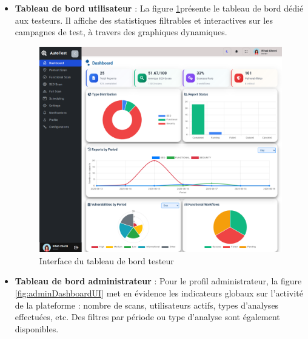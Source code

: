 \begin{itemize}[label=$\bullet$]
   \item \textbf{Tableau de bord utilisateur} :   La figure \ref{fig:testerdashboardUI}présente le tableau de bord dédié aux testeurs. Il affiche  des statistiques filtrables et interactives sur les campagnes de test, à travers des graphiques dynamiques.
    \begin{figure}[H]
        \centering
        \includegraphics[width=\linewidth]{chapitres/ch4Sp2/section/sprint2.2/img/interface/tester-dashbaord.png}
        \caption{\centering Interface du tableau de bord testeur}
        \label{fig:testerdashboardUI}
    \end{figure}
    \vspace{-0.3cm}
    \item \textbf{Tableau de bord administrateur} :  
    Pour le profil administrateur, la figure \ref{fig:adminDashboardUI} met en évidence les indicateurs globaux sur l'activité de la plateforme : nombre de scans, utilisateurs actifs, types d’analyses effectuées, etc. Des filtres par période ou type d’analyse sont également disponibles.
    \begin{figure}[H]
        \centering

\end{figure}
\end{itemize}

